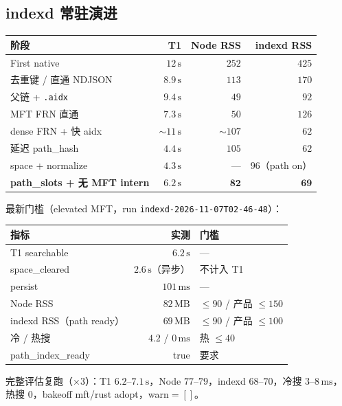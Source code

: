 \documentclass[UTF8,a4paper,11pt]{ctexart}
\begin{document}
\subsection{indexd 常驻演进}
\begin{center}
\begin{tabular}{@{}lrrr@{}}
\toprule
阶段 & T1 & Node RSS & indexd RSS \\
\midrule
First native & $12\,\mathrm{s}$ & $252$ & $425$ \\
去重键 / 直通 NDJSON & $8.9\,\mathrm{s}$ & $113$ & $170$ \\
父链 + \texttt{.aidx} & $9.4\,\mathrm{s}$ & $49$ & $92$ \\
MFT FRN 直通 & $7.3\,\mathrm{s}$ & $50$ & $126$ \\
dense FRN + 快 aidx & $\sim 11\,\mathrm{s}$ & $\sim 107$ & $62$ \\
延迟 path\_hash & $4.4\,\mathrm{s}$ & $105$ & $62$ \\
space + normalize & $4.3\,\mathrm{s}$ & — & $96$（path on） \\
\textbf{path\_slots + 无 MFT intern} & $\mathbf{6.2\,\mathrm{s}}$ & $\mathbf{82}$ & $\mathbf{69}$ \\
\bottomrule
\end{tabular}
\end{center}

最新门槛（elevated MFT，run \texttt{indexd-2026-11-07T02-46-48}）：
\begin{center}
\begin{tabular}{@{}lrl@{}}
\toprule
指标 & 实测 & 门槛 \\
\midrule
T1 searchable & $6.2\,\mathrm{s}$ & — \\
space\_cleared & $2.6\,\mathrm{s}$（异步） & 不计入 T1 \\
persist & $101\,\mathrm{ms}$ & — \\
Node RSS & $82\,\mathrm{MB}$ & $\le 90$ / 产品 $\le 150$ \\
indexd RSS（path ready） & $69\,\mathrm{MB}$ & $\le 90$ / 产品 $\le 100$ \\
冷 / 热搜 & $4.2$ / $0\,\mathrm{ms}$ & 热 $\le 40$ \\
path\_index\_ready & true & 要求 \\
\bottomrule
\end{tabular}
\end{center}

完整评估复跑（$\times 3$）：T1 $6.2$–$7.1\,\mathrm{s}$，Node $77$–$79$，indexd $68$–$70$，冷搜 $3$–$8\,\mathrm{ms}$，热搜 $0$，bakeoff mft/rust adopt，warn$=[]$。
\end{document}
